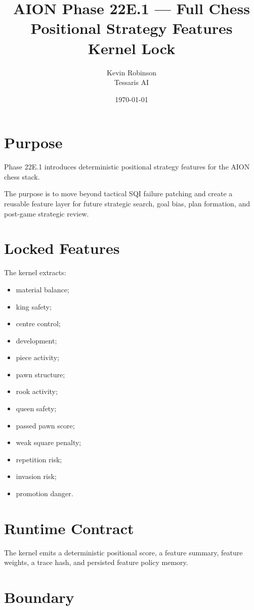 \documentclass[11pt,a4paper]{article}
\title{\textbf{AION Phase 22E.1 --- Full Chess Positional Strategy Features Kernel Lock}}
\author{Kevin Robinson\\Tessaris AI}
\date{\today}
\begin{document}
\maketitle

\section{Purpose}

Phase 22E.1 introduces deterministic positional strategy features for the AION chess stack.

The purpose is to move beyond tactical SQI failure patching and create a reusable feature layer for future strategic search, goal bias, plan formation, and post-game strategic review.

\section{Locked Features}

The kernel extracts:

\begin{itemize}[leftmargin=*]
  \item material balance;
  \item king safety;
  \item centre control;
  \item development;
  \item piece activity;
  \item pawn structure;
  \item rook activity;
  \item queen safety;
  \item passed pawn score;
  \item weak square penalty;
  \item repetition risk;
  \item invasion risk;
  \item promotion danger.
\end{itemize}

\section{Runtime Contract}

The kernel emits a deterministic positional score, a feature summary, feature weights, a trace hash, and persisted feature policy memory.

\section{Boundary}
\end{document}
